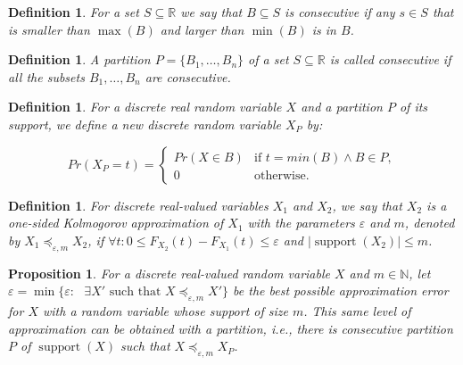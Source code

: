 \documentclass[review]{elsarticle}
\newtheorem{definition}[lemma]{Definition}
\newtheorem{proposition}[lemma]{Proposition}
\DeclareMathOperator{\supp}{support}
\DeclareMathOperator{\support}{support}
\begin{document}
\begin{definition}\label{consecutive} For a set $S \subseteq \mathbb{R}$ we say that
$B \subseteq S$ is \emph{consecutive} if any $s\in S$ that is smaller than $\max(B)$ and larger than $\min(B)$ is in $B$.
\end{definition}

\begin{definition}\label{part_consecutive} A partition $P=\{B_1,\dots,B_n\}$ of a set $S \subseteq \mathbb{R}$ is called 
\emph{consecutive} if all the subsets $B_1 ,\dots,B_n$ are consecutive.
\end{definition}


\begin{definition}\label{partition}
	For a discrete real random variable $X$ and a partition $P$ of its support, we define a new discrete random variable $X_P$ by:
	
	$$Pr(X_P = t) = \begin{cases} 
	Pr(X\in B) &  \text{if } t = min(B) \wedge  B \in P, \\
	0      & \text{otherwise.}
	\end{cases}$$
\end{definition}


\begin{definition}
	For discrete real-valued variables $X_1$ and $X_2$, we say that $X_2$ is a one-sided Kolmogorov approximation of $X_1$ with the parameters $\varepsilon$ and $m$, denoted by 
	$X_1 \preceq_{\varepsilon,m} X_2$, if $\forall t\colon 0 \leq   F_{X_2}(t)-F_{X_1}(t) \leq \varepsilon$ and $|\support(X_2)| \leq m$. 
\end{definition}

\begin{proposition}
	For a discrete real-valued random variable $X$ and $m \in \mathbb{N}$, 
	let $\varepsilon = \min\{\varepsilon \colon \text{  $\exists X'$ such that $X \preceq_{\varepsilon,m} X'$}\}$ be the best possible approximation error for $X$ with a random variable whose support of size $m$. This same level of approximation can be obtained with a partition, i.e., there is consecutive partition $P$ of $\supp(X)$ such that $X \preceq_{\varepsilon,m} X_P$.
	
\end{proposition}
\end{document}
